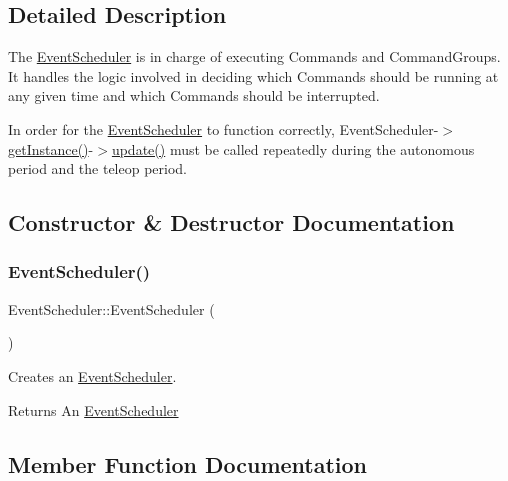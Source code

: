 \subsection{Detailed Description}
The \mbox{\hyperlink{classlib_iterative_robot_1_1_event_scheduler}{Event\+Scheduler}} is in charge of executing Commands and Command\+Groups. It handles the logic involved in deciding which Commands should be running at any given time and which Commands should be interrupted.

In order for the \mbox{\hyperlink{classlib_iterative_robot_1_1_event_scheduler}{Event\+Scheduler}} to function correctly, Event\+Scheduler-\/$>$\mbox{\hyperlink{classlib_iterative_robot_1_1_event_scheduler_a04480f5533265708f49b23e622ffe9cb}{get\+Instance()}}-\/$>$\mbox{\hyperlink{classlib_iterative_robot_1_1_event_scheduler_a9643c8e8dd7a87a1a3419415c7cc46bc}{update()}} must be called repeatedly during the autonomous period and the teleop period. 

\subsection{Constructor \& Destructor Documentation}
\mbox{\label{classlib_iterative_robot_1_1_event_scheduler_a5d0af0bdbbb5948ab06075ef12fc8aa0}} 
\subsubsection{\texorpdfstring{EventScheduler()}{EventScheduler()}}
{\footnotesize\ttfamily Event\+Scheduler\+::\+Event\+Scheduler (\begin{DoxyParamCaption}{ }\end{DoxyParamCaption})\hspace{0.3cm}{\ttfamily [private]}}



Creates an \mbox{\hyperlink{classlib_iterative_robot_1_1_event_scheduler}{Event\+Scheduler}}. 

\begin{DoxyReturn}{Returns}
An \mbox{\hyperlink{classlib_iterative_robot_1_1_event_scheduler}{Event\+Scheduler}} 
\end{DoxyReturn}


\subsection{Member Function Documentation}
\mbox{\label{classlib_iterative_robot_1_1_event_scheduler_aac82a5f0c53789fe6170085b033efbbc}} 
